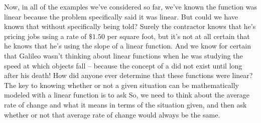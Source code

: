 
\bigskip

Now, in all of the examples we’ve considered so far, we’ve known the function was linear because the problem specifically said it was linear. But could we have known that without specifically being told? Surely the contractor knows that he’s pricing jobs using a rate of $\$1.50$ per square foot, but it’s not at all certain that he knows that he’s using the slope of a linear function. And we know for certain that Galileo wasn’t thinking about linear functions when he was studying the speed at which objects fall – because the concept of a  did not exist until long after his death!  How did anyone ever determine that these functions were linear?\\

The key to knowing whether or not a given situation can be mathematically modeled with a linear function is to ask  So, we need to think about the average rate of change and what it means in terms of the situation given, and then ask whether or not that average rate of change would always be the same.\\

